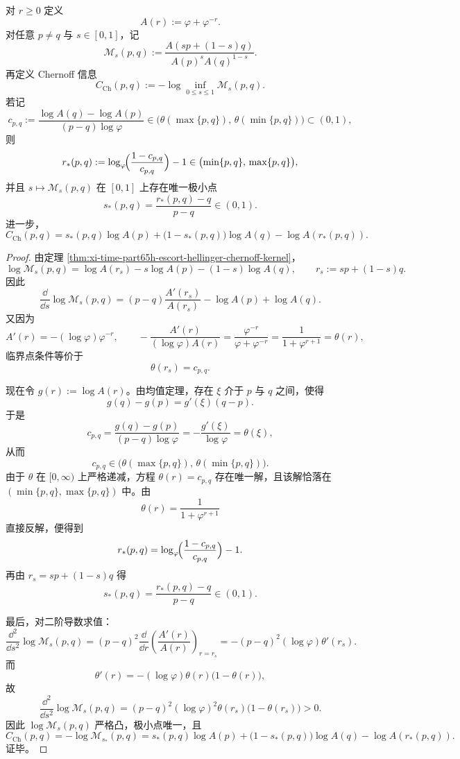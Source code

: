 \begin{theorem}\label{thm:xi-time-part9sb-escort-chernoff-saddle}
对 \(r\ge 0\) 定义
\[
A(r):=\varphi+\varphi^{-r}.
\]
对任意 \(p\neq q\) 与 \(s\in[0,1]\)，记
\[
\mathcal M_s(p,q)
:=
\frac{A(sp+(1-s)q)}{A(p)^sA(q)^{1-s}}.
\]
再定义 Chernoff 信息
\[
C_{\mathrm{Ch}}(p,q):=
-\log\inf_{0\le s\le 1}\mathcal M_s(p,q).
\]
若记
\[
c_{p,q}
:=
\frac{\log A(q)-\log A(p)}{(p-q)\log\varphi}
\in
\bigl(\theta(\max\{p,q\}),\,\theta(\min\{p,q\})\bigr)\subset(0,1),
\]
则
\[
r_*(p,q)
:=
\log_\varphi\!\Bigl(\frac{1-c_{p,q}}{c_{p,q}}\Bigr)-1
\in
\bigl(\min\{p,q\},\,\max\{p,q\}\bigr),
\]
并且 \(s\mapsto \mathcal M_s(p,q)\) 在 \([0,1]\) 上存在唯一极小点
\[
s_*(p,q)=\frac{r_*(p,q)-q}{p-q}\in(0,1).
\]
进一步，
\[
C_{\mathrm{Ch}}(p,q)
=
s_*(p,q)\log A(p)
+
\bigl(1-s_*(p,q)\bigr)\log A(q)
-
\log A(r_*(p,q)).
\]
\end{theorem}
\begin{proof}
由定理 \ref{thm:xi-time-part65h-escort-hellinger-chernoff-kernel}，
\[
\log \mathcal M_s(p,q)
=
\log A(r_s)-s\log A(p)-(1-s)\log A(q),
\qquad
r_s:=sp+(1-s)q.
\]
因此
\[
\frac{\dd}{\dd s}\log \mathcal M_s(p,q)
=
(p-q)\frac{A'(r_s)}{A(r_s)}-\log A(p)+\log A(q).
\]
又因为
\[
A'(r)=-(\log\varphi)\varphi^{-r},
\qquad
-\frac{A'(r)}{(\log\varphi)A(r)}
=
\frac{\varphi^{-r}}{\varphi+\varphi^{-r}}
=
\frac{1}{1+\varphi^{r+1}}
=
\theta(r),
\]
临界点条件等价于
\[
\theta(r_s)=c_{p,q}.
\]

现在令 \(g(r):=\log A(r)\)。由均值定理，存在 \(\xi\) 介于 \(p\) 与 \(q\) 之间，使得
\[
g(q)-g(p)=g'(\xi)(q-p).
\]
于是
\[
c_{p,q}
=
\frac{g(q)-g(p)}{(p-q)\log\varphi}
=
-\frac{g'(\xi)}{\log\varphi}
=
\theta(\xi),
\]
从而
\[
c_{p,q}\in
\bigl(\theta(\max\{p,q\}),\,\theta(\min\{p,q\})\bigr).
\]
由于 \(\theta\) 在 \([0,\infty)\) 上严格递减，方程 \(\theta(r)=c_{p,q}\) 存在唯一解，且该解恰落在 \((\min\{p,q\},\max\{p,q\})\) 中。由
\[
\theta(r)=\frac{1}{1+\varphi^{r+1}}
\]
直接反解，便得到
\[
r_*(p,q)=\log_\varphi\!\Bigl(\frac{1-c_{p,q}}{c_{p,q}}\Bigr)-1.
\]
再由 \(r_s=sp+(1-s)q\) 得
\[
s_*(p,q)=\frac{r_*(p,q)-q}{p-q}\in(0,1).
\]

最后，对二阶导数求值：
\[
\frac{\dd^2}{\dd s^2}\log \mathcal M_s(p,q)
=
(p-q)^2\frac{\dd}{\dd r}\!\left(\frac{A'(r)}{A(r)}\right)_{r=r_s}
=
-(p-q)^2(\log\varphi)\theta'(r_s).
\]
而
\[
\theta'(r)=-(\log\varphi)\theta(r)\bigl(1-\theta(r)\bigr),
\]
故
\[
\frac{\dd^2}{\dd s^2}\log \mathcal M_s(p,q)
=
(p-q)^2(\log\varphi)^2\theta(r_s)\bigl(1-\theta(r_s)\bigr)>0.
\]
因此 \(\log\mathcal M_s(p,q)\) 严格凸，极小点唯一，且
\[
C_{\mathrm{Ch}}(p,q)
=
-\log \mathcal M_{s_*}(p,q)
=
s_*(p,q)\log A(p)
+
\bigl(1-s_*(p,q)\bigr)\log A(q)
-
\log A(r_*(p,q)).
\]
证毕。
\end{proof}

